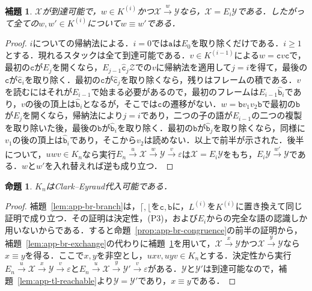 \documentclass[11pt,a4paper]{ltjsarticle}
\numberwithin{equation}{section}
\theoremstyle{plain}
\newtheorem{lemma}[theorem]{補題}
\newtheorem{proposition}[theorem]{命題}
\theoremstyle{definition}
\theoremstyle{remark}
\newcommand{\eps}{\varepsilon}
\begin{document}
\begin{lemma}\label{lem:app-tl-recognition}
$\mathcal X$が到達可能で，$w\in K^{(i)}$かつ$\mathcal X\xrightarrow{w}\mathcal Y$なら，$\mathcal X=E_i\mathcal Y$である．したがって全ての$w,w'\in K^{(i)}$について$w\equiv w'$である．
\end{lemma}

\begin{proof}
$i$についての帰納法による．$i=0$では$\mathtt a$は$E_0$を取り除くだけである．$i\ge1$とする．現れるスタックは全て到達可能である．$v\in K^{(i-1)}$による$w=\mathtt cv\mathtt c$で，最初の$\mathtt c$が$E_j$を開くなら，$E_{j-1}\hat{\mathtt c}_j\mathcal Z$での$v$に帰納法を適用して$j=i$を得て，最後の$\mathtt c$が$\hat{\mathtt c}_i$を取り除く．最初の$\mathtt c$が$\hat{\mathtt c}_j$を取り除くなら，残りはフレームの積である．$v$を読むにはそれが$E_{i-1}$で始まる必要があるので，最初のフレームは$E_{i-1}\hat{\mathtt b}_i$であり，$v$の後の頂上は$\hat{\mathtt b}_i$となるが，そこでは$\mathtt c$の遷移がない．$w=\mathtt bv_1v_2\mathtt b$で最初の$\mathtt b$が$E_j$を開くなら，帰納法により$j=i$であり，二つの子の語が$E_{i-1}$の二つの複製を取り除いた後，最後の$\mathtt b$が$\hat{\mathtt b}_i$を取り除く．最初の$\mathtt b$が$\hat{\mathtt b}_j$を取り除くなら，同様に$v_1$の後の頂上は$\hat{\mathtt b}_i$であり，そこから$v_2$は読めない．以上で前半が示された．後半について，$uwv\in K_n$なら実行$E_n\xrightarrow{u}\mathcal X\xrightarrow{w}\mathcal Y\xrightarrow{v}\eps$は$\mathcal X=E_i\mathcal Y$をもち，$E_i\mathcal Y\xrightarrow{w'}\mathcal Y$である．$w$と$w'$を入れ替えれば逆も成り立つ．
\end{proof}

\begin{proposition}\label{prop:app-tl-congruence}
$K_n$はClark--Eyraud代入可能である．
\end{proposition}

\begin{proof}
補題~\ref{lem:app-br-branch}は，$\lceil,\lfloor$を$\mathtt c,\mathtt b$に，$L^{(i)}$を$K^{(i)}$に置き換えて同じ証明で成り立つ．その証明は決定性，(P3)，および$E_i$からの完全な語の認識しか用いないからである．すると命題~\ref{prop:app-br-congruence}の前半の証明から，補題~\ref{lem:app-br-exchange}の代わりに補題~\ref{lem:app-tl-recognition}を用いて，$\mathcal X\xrightarrow{x}\mathcal Y$かつ$\mathcal X\xrightarrow{y}\mathcal Y$なら$x\equiv y$を得る．ここで$x,y$を非空とし，$uxv,uyv\in K_n$とする．決定性から実行$E_n\xrightarrow{u}\mathcal X\xrightarrow{x}\mathcal Y\xrightarrow{v}\eps$と$E_n\xrightarrow{u}\mathcal X\xrightarrow{y}\mathcal Y'\xrightarrow{v}\eps$がある．$\mathcal Y$と$\mathcal Y'$は到達可能なので，補題~\ref{lem:app-tl-reachable}より$\mathcal Y=\mathcal Y'$であり，$x\equiv y$である．
\end{proof}
\end{document}
